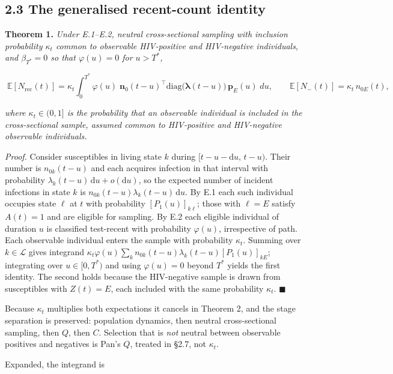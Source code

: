 \subsection{2.3 The generalised recent-count identity}

\textbf{Theorem 1.} \emph{Under E.1--E.2, neutral cross-sectional sampling with inclusion probability \(\kappa_t\) common to observable HIV-positive and HIV-negative individuals, and \(\beta_{T^*}=0\) so that \(\varphi(u)=0\) for \(u>T^*\),}

\[
\boxed{\;
\mathbb{E}[N_{\mathrm{rec}}(t)]
=
\kappa_t\!\int_0^{T^*}\!
\varphi(u)\;
\mathbf{n}_0(t-u)^{\!\top}\mathrm{diag}\big(\boldsymbol\lambda(t-u)\big)\,\mathbf{p}_E(u)
\;du,
\qquad
\mathbb{E}[N_-(t)] = \kappa_t\, n_{0E}(t),
\;}
\]

\emph{where \(\kappa_t\in(0,1]\) is the probability that an observable individual is included in the cross-sectional sample, assumed common to HIV-positive and HIV-negative observable individuals.}

\emph{Proof.} Consider susceptibles in living state \(k\) during \([t-u-\mathrm{d}u,\,t-u)\). Their number is \(n_{0k}(t-u)\) and each acquires infection in that interval with probability \(\lambda_k(t-u)\,\mathrm{d}u + o(\mathrm{d}u)\), so the expected number of incident infections in state \(k\) is \(n_{0k}(t-u)\lambda_k(t-u)\,\mathrm{d}u\). By E.1 each such individual occupies state \(\ell\) at \(t\) with probability \([P_1(u)]_{k\ell}\); those with \(\ell=E\) satisfy \(A(t)=1\) and are eligible for sampling. By E.2 each eligible individual of duration \(u\) is classified test-recent with probability \(\varphi(u)\), irrespective of path. Each observable individual enters the sample with probability \(\kappa_t\). Summing over \(k\in\mathcal{L}\) gives integrand \(\kappa_t\varphi(u)\sum_{k}n_{0k}(t-u)\lambda_k(t-u)[P_1(u)]_{kE}\); integrating over \(u\in[0,T^*)\) and using \(\varphi(u)=0\) beyond \(T^*\) yields the first identity. The second holds because the HIV-negative sample is drawn from susceptibles with \(Z(t)=E\), each included with the same probability \(\kappa_t\). \(\blacksquare\)

Because \(\kappa_t\) multiplies both expectations it cancels in Theorem 2, and the stage separation is preserved: population dynamics, then neutral cross-sectional sampling, then \(Q\), then \(C\). Selection that is \emph{not} neutral between observable positives and negatives is Pan's \(Q\), treated in §2.7, not \(\kappa_t\).

Expanded, the integrand is

